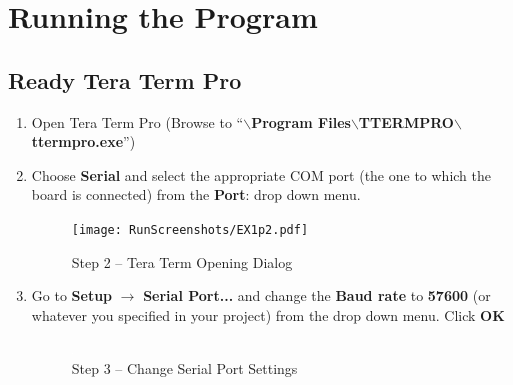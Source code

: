 \section{Running the Program}
	\subsection{Ready Tera Term Pro}
		\begin{enumerate}
			\item Open Tera Term Pro (Browse to ``\textbf{$\backslash$Program Files$\backslash$TTERMPRO$\backslash$ttermpro.exe}'')
			
			\item Choose \textbf{Serial} and select the appropriate COM port (the one to which the board is connected) from the \textbf{Port}: drop down menu.
			
			
\begin{figure}[htbp]
	\centering
		\texttt{[image: RunScreenshots/EX1p2.pdf]}
	\caption{Step 2 -- Tera Term Opening Dialog}
	\label{fig:EX1p2}
\end{figure}

			
			\item Go to \textbf{Setup} $\rightarrow$ \textbf{Serial Port...} and change the \textbf{Baud rate} to \textbf{57600} (or whatever you specified in your project) from the drop down menu. Click \textbf{OK}
			
			
\begin{figure}[htbp]
	\centering
		\includegraphics[width=.5\textwidth]{RunScreenshots/EX1p3a.pdf}
	\caption{Step 3 -- Change Serial Port Settings}
	\label{fig:EX1p3a} 
\end{figure}


\end{enumerate}
